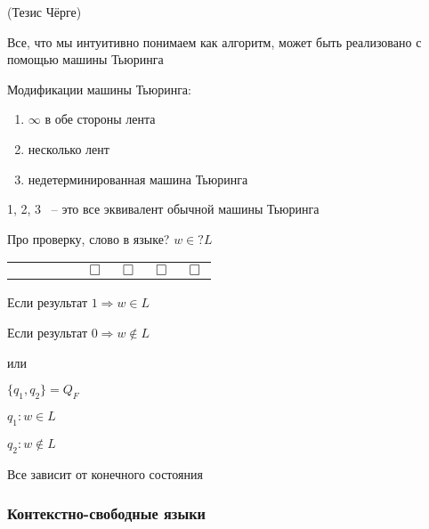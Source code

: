 \documentclass[russian]{lecture-notes}
\begin{document}
\begin{remark}
	(Тезис Чёрге)
	
	Все, что мы интуитивно понимаем как алгоритм, может быть реализовано с помощью машины Тьюринга
\end{remark}

\begin{remark}
	Модификации машины Тьюринга:
	
	\begin{enumerate}
		\item{
			$\infty$ в обе стороны лента		
		}
		\item{
			несколько лент		
		}
		\item{
			недетерминированная машина Тьюринга		
		}
	\end{enumerate}
	
	1, 2, 3 ~-- это все эквивалент обычной машины Тьюринга
\end{remark}

\begin{remark}
	Про проверку, слово в языке? $w \in ? L$
	
	\begin{table}[H]
	\centering
	\begin{tabular}{ *{9}{c} }
  \cline{1-9} 
    \multicolumn{1}{|c}{ } & 
    \multicolumn{1}{|c}{ } & 
    \multicolumn{1}{|c}{ } & 
    \multicolumn{1}{|c}{ } & 
	\multicolumn{1}{|c}{ } &     
	\multicolumn{1}{|c}{$\Box$} & 
	\multicolumn{1}{|c}{$\Box$} & 
	\multicolumn{1}{|c}{$\Box$} &     
    \multicolumn{1}{|c|}{$\Box$} \\
  \cline{1-9}  
	\end{tabular}
	\end{table}		
	
	Если результат $1 \Rightarrow w \in L$
	
	Если результат $0 \Rightarrow w \notin L$
	
	или 
	
	$\{ q_1, q_2\} = Q_F$
	
	$q_1: w \in L$
	
	$q_2: w \notin L$
	
	Все зависит от конечного состояния
\end{remark}

\subsubsection{Контекстно-свободные языки}
\end{document}
